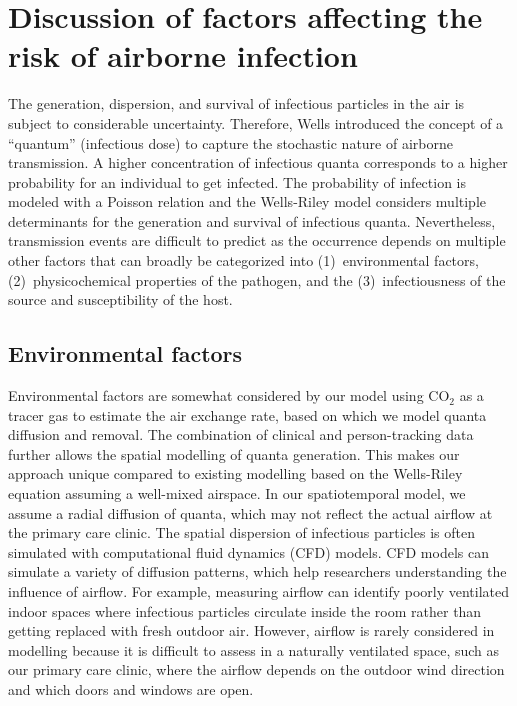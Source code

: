 \documentclass[fleqn,11pt]{wlscirep_supp}
\begin{document}
\clearpage

\section{Discussion of factors affecting the risk of airborne infection}\label{sec:depth-discussion}


The generation, dispersion, and survival of infectious particles in the air is subject to considerable uncertainty. Therefore, Wells\cite{Wells1955} introduced the concept of a ``quantum'' (infectious dose) to capture the stochastic nature of airborne transmission. A higher concentration of infectious quanta corresponds to a higher probability for an individual to get infected. The probability of infection is modeled with a Poisson relation and the Wells-Riley model considers multiple determinants for the generation and survival of infectious quanta. Nevertheless, transmission events are difficult to predict as the occurrence depends on multiple other factors that can broadly be categorized into (1)~environmental factors, (2)~physicochemical properties of the pathogen, and the (3)~infectiousness of the source and susceptibility of the host. 

\subsection{Environmental factors}

Environmental factors are somewhat considered by our model using CO$_2$ as a tracer gas to estimate the air exchange rate, based on which we model quanta diffusion and removal. The combination of clinical and person-tracking data further allows the spatial modelling of quanta generation. This makes our approach unique compared to existing modelling based on the Wells-Riley equation assuming a well-mixed airspace\cite{Riley1961Book,Rudnick2003IndoorAir}. In our spatiotemporal model, we assume a radial diffusion of quanta, which may not reflect the actual airflow at the primary care clinic. The spatial dispersion of infectious particles is often simulated with computational fluid dynamics (CFD) models\cite{Vuorinen2020SafSci,Jung2021InfectChemo,Li2021BuildEnv}. CFD models can simulate a variety of diffusion patterns, which help researchers understanding the influence of airflow. For example, measuring airflow can identify poorly ventilated indoor spaces where infectious particles circulate inside the room rather than getting replaced with fresh outdoor air\cite{Li2021BuildEnv}. However, airflow is rarely considered in modelling because it is difficult to assess in a naturally ventilated space, such as our primary care clinic, where the airflow depends on the outdoor wind direction and which doors and windows are open. 
\end{document}
